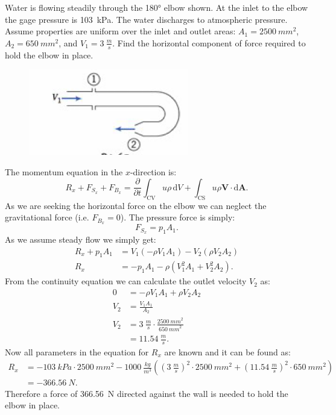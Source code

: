 
Water is flowing steadily through the \ang{180} elbow shown. At the inlet to the elbow the gage pressure is \qty{103}{kPa}. The water discharges to atmospheric pressure. Assume properties are uniform over the inlet and outlet areas: $A_1 = \qty{2500}{mm^2}$, $A_2 = \qty{650}{mm^2}$, and $V_1 = \qty{3}{\frac{m}{s}}$. Find the horizontal component of force required to hold the elbow in place.


\begin{figure} [ht]
  \centering
  \includegraphics[width=0.25\linewidth]{./figures/e4_17.png}
\end{figure}

\bigbreak
The momentum equation in the $x$-direction is:
\[ 
R_x + F_{S_x} + F_{B_x} = \frac{\partial}{\partial t} \int_{\mathrm{CV}} u \rho \, \mathrm{d}V + \int_{\mathrm{CS}} u \rho \textbf{V} \cdot \mathrm{d}\textbf{A}
.\]
As we are seeking the horizontal force on the elbow we can neglect the gravitational force (i.e. $F_{B_x} = 0$). The pressure force is simply:
\[ 
F_{S_x} = p_1 A_1
.\]
As we assume steady flow we simply get:
\begin{align*}
R_{x} + p_1 A_1 &= V_1 \left( - \rho V_1 A_1 \right) - V_2 \left( \rho V_2 A_2 \right) \\
R_x &= - p_1 A_1 - \rho \left( V_1^2 A_1 + V_2^2 A_2 \right)
.\end{align*}
From the continuity equation we can calculate the outlet velocity $V_2$ as:
\begin{align*}
  0 &= - \rho V_1 A_1 + \rho V_2 A_2 \\
  V_2 &= \frac{V_1 A_1}{A_2} \\
  V_2 &= \qty{3}{\frac{m}{s}} \cdot \frac{\qty{2500}{mm}^2}{\qty{650}{mm}^2} \\
      &= \qty{11,54}{\frac{m}{s}}
.\end{align*}
Now all parameters in the equation for $R_x$ are known and it can be found as:
\begin{align*}
  R_x &= -\qty{103}{kPa} \cdot \qty{2500}{mm^2} - \qty{1000}{\frac{kg}{m^3}} \left( \left( \qty{3}{\frac{m}{s}}  \right)^2 \cdot \qty{2500}{mm^2} + \left( \qty{11,54}{\frac{m}{s}}  \right)^2 \cdot \qty{650}{mm^2} \right) \\
      &= - \qty{366,56}{N} 
.\end{align*}
Therefore a force of \qty{366,56}{N} directed against the wall is needed to hold the elbow in place. 


